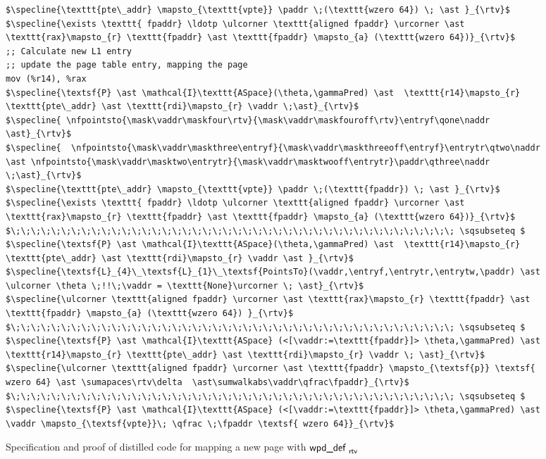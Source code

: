 \begin{figure}
\begin{lstlisting}
$\specline{\texttt{pte\_addr} \mapsto_{\texttt{vpte}} \paddr \;(\texttt{wzero 64}) \; \ast }_{\rtv}$
$\specline{\exists \texttt{ fpaddr} \ldotp \ulcorner \texttt{aligned fpaddr} \urcorner \ast \texttt{rax}\mapsto_{r} \texttt{fpaddr} \ast \texttt{fpaddr} \mapsto_{a} (\texttt{wzero 64})}_{\rtv}$
;; Calculate new L1 entry
;; update the page table entry, mapping the page
mov (%r14), %rax
$\specline{\textsf{P} \ast \mathcal{I}\texttt{ASpace}(\theta,\gammaPred) \ast  \texttt{r14}\mapsto_{r} \texttt{pte\_addr} \ast \texttt{rdi}\mapsto_{r} \vaddr \;\ast}_{\rtv}$
$\specline{ \nfpointsto{\mask\vaddr\maskfour\rtv}{\mask\vaddr\maskfouroff\rtv}\entryf\qone\naddr \ast}_{\rtv}$ 
$\specline{  \nfpointsto{\mask\vaddr\maskthree\entryf}{\mask\vaddr\maskthreeoff\entryf}\entrytr\qtwo\naddr \ast \nfpointsto{\mask\vaddr\masktwo\entrytr}{\mask\vaddr\masktwooff\entrytr}\paddr\qthree\naddr \;\ast}_{\rtv}$
$\specline{\texttt{pte\_addr} \mapsto_{\texttt{vpte}} \paddr \;(\texttt{fpaddr}) \; \ast }_{\rtv}$
$\specline{\exists \texttt{ fpaddr} \ldotp \ulcorner \texttt{aligned fpaddr} \urcorner \ast \texttt{rax}\mapsto_{r} \texttt{fpaddr} \ast \texttt{fpaddr} \mapsto_{a} (\texttt{wzero 64})}_{\rtv}$
$\;\;\;\;\;\;\;\;\;\;\;\;\;\;\;\;\;\;\;\;\;\;\;\;\;\;\;\;\;\;\;\;\;\;\;\;\;\;\;\;\;\;\;\; \sqsubseteq $
$\specline{\textsf{P} \ast \mathcal{I}\texttt{ASpace}(\theta,\gammaPred) \ast  \texttt{r14}\mapsto_{r} \texttt{pte\_addr} \ast \texttt{rdi}\mapsto_{r} \vaddr \ast }_{\rtv}$
$\specline{\textsf{L}_{4}\_\textsf{L}_{1}\_\textsf{PointsTo}(\vaddr,\entryf,\entrytr,\entrytw,\paddr) \ast \ulcorner \theta \;!!\;\vaddr = \texttt{None}\urcorner \; \ast}_{\rtv}$
$\specline{\ulcorner \texttt{aligned fpaddr} \urcorner \ast \texttt{rax}\mapsto_{r} \texttt{fpaddr} \ast \texttt{fpaddr} \mapsto_{a} (\texttt{wzero 64}) }_{\rtv}$
$\;\;\;\;\;\;\;\;\;\;\;\;\;\;\;\;\;\;\;\;\;\;\;\;\;\;\;\;\;\;\;\;\;\;\;\;\;\;\;\;\;\;\;\; \sqsubseteq $
$\specline{\textsf{P} \ast \mathcal{I}\texttt{ASpace} (<[\vaddr:=\texttt{fpaddr}]> \theta,\gammaPred) \ast  \texttt{r14}\mapsto_{r} \texttt{pte\_addr} \ast \texttt{rdi}\mapsto_{r} \vaddr \; \ast}_{\rtv}$
$\specline{\ulcorner \texttt{aligned fpaddr} \urcorner \ast \texttt{fpaddr} \mapsto_{\textsf{p}} \textsf{ wzero 64} \ast \sumapaces\rtv\delta  \ast\sumwalkabs\vaddr\qfrac\fpaddr}_{\rtv}$
$\;\;\;\;\;\;\;\;\;\;\;\;\;\;\;\;\;\;\;\;\;\;\;\;\;\;\;\;\;\;\;\;\;\;\;\;\;\;\;\;\;\;\;\; \sqsubseteq $
$\specline{\textsf{P} \ast \mathcal{I}\texttt{ASpace} (<[\vaddr:=\texttt{fpaddr}]> \theta,\gammaPred) \ast \vaddr \mapsto_{\textsf{vpte}}\; \qfrac \;\fpaddr \textsf{ wzero 64}}_{\rtv}$
\end{lstlisting}
  \caption{Specification and proof of distilled code for mapping a new page with $\textsf{wpd\_def }_{\textsf{rtv}}$}
\label{fig:mapping_code}
\end{figure}
